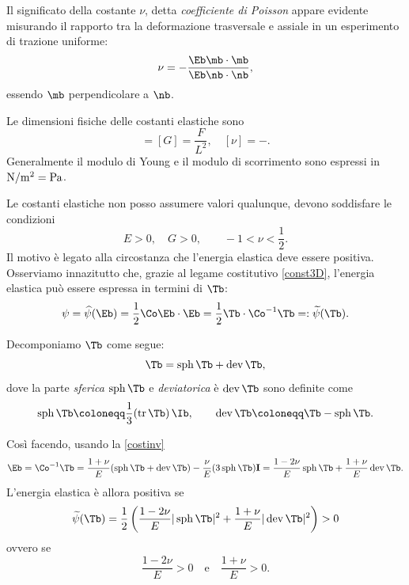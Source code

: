 \begin{enumerate}
	Il significato della costante $\nu$, detta \textit{coefficiente di Poisson} appare evidente misurando il rapporto tra la deformazione trasversale e assiale in un esperimento di trazione uniforme:
	\begin{equation}
		\nu=-\frac{\Eb \mb \cdot \mb}{\Eb \nb \cdot \nb},
	\end{equation}
	essendo $\mb$ perpendicolare a $\nb$.
\end{enumerate}


\vspace{.3cm}
Le dimensioni fisiche delle costanti elastiche sono
\begin{equation}
	[E]=[G]=\frac{F}{L^2}, \quad [\nu]=-.
\end{equation}
Generalmente il modulo di Young e il modulo di scorrimento sono espressi in ${\rm N}/{\rm m}^2={\rm Pa}$.

\vspace{.3cm}

Le costanti elastiche non posso assumere valori qualunque, devono soddisfare le condizioni 
\begin{equation}
			E>0, \quad G>0, \qquad -1<\nu<\frac12.
\end{equation}
Il motivo è legato alla circostanza che l'energia elastica deve essere positiva. Osserviamo innazitutto che, grazie al legame costitutivo \eqref{const3D}, l'energia elastica può essere espressa in termini di $\Tb$:
\begin{equation}
\psi=\widehat\psi(\Eb)=\frac12 \Co \Eb \cdot \Eb =\frac 12 \Tb \cdot \Co^{-1}\Tb=:\widetilde{\psi}(\Tb).
\end{equation}

Decomponiamo $\Tb$ come segue:
\begin{equation}
\Tb=\operatorname{sph}\Tb+\operatorname{dev}\Tb, 
\end{equation}
dove la parte \textit{sferica}  $\operatorname{sph}\Tb$ e \textit{deviatorica} è  $\operatorname{dev}\Tb$ sono definite come
\begin{equation}
	\operatorname{sph}\Tb\coloneqq \frac{1}{3}(\operatorname{tr}\Tb)\, \Ib, \qquad \operatorname{dev}\Tb\coloneqq \Tb-	\operatorname{sph}\Tb.
\end{equation}

Così facendo, usando la \eqref{costinv}
\begin{equation}
\Eb=\Co ^{-1}\Tb =\frac{1+\nu}{E}(\operatorname{sph}\Tb+\operatorname{dev}\Tb)-\frac{\nu}{E}(3	\operatorname{sph}\Tb)\mathbf{I}=\frac{1-2\nu}{E}	\operatorname{sph}\Tb+\frac{1+\nu}{E}	\operatorname{dev}\Tb.
\end{equation}
L'energia elastica è allora positiva se
\begin{equation}\label{ensf}
\widetilde{\psi}(\Tb)=\frac{1}{2}\left( \frac{1-2\nu}{E}	|\operatorname{sph}\Tb|^2+\frac{1+\nu}{E}	|\operatorname{dev}\Tb|^2\right)>0
\end{equation}
ovvero se
\begin{equation}
\frac{1-2\nu}{E}>0 \quad \textrm{e} \quad \frac{1+\nu}{E}>0.
\end{equation}

